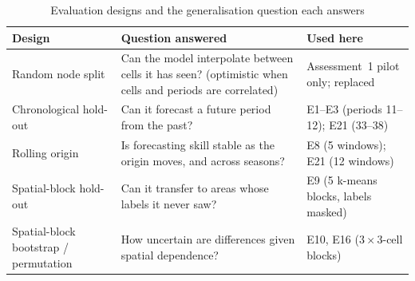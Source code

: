 \documentclass[11pt,a4paper]{report}
\begin{document}
\begin{table}[H]
\centering\scriptsize
\caption{Evaluation designs and the generalisation question each answers}
\label{tab:evtypes}
\begin{tabularx}{\textwidth}{@{}L{3.2cm} Y L{3.4cm}@{}}
\toprule
Design & Question answered & Used here\\
\midrule
Random node split & Can the model interpolate between cells it has seen? (optimistic when cells and periods are correlated) & Assessment~1 pilot only; replaced\\
Chronological hold-out & Can it forecast a future period from the past? & E1--E3 (periods 11--12); E21 (33--38)\\
Rolling origin & Is forecasting skill stable as the origin moves, and across seasons? & E8 (5 windows); E21 (12 windows)\\
Spatial-block hold-out & Can it transfer to areas whose labels it never saw? & E9 (5 k-means blocks, labels masked)\\
Spatial-block bootstrap / permutation & How uncertain are differences given spatial dependence? & E10, E16 ($3\times3$-cell blocks)\\
\bottomrule
\end{tabularx}
\end{table}
\end{document}
